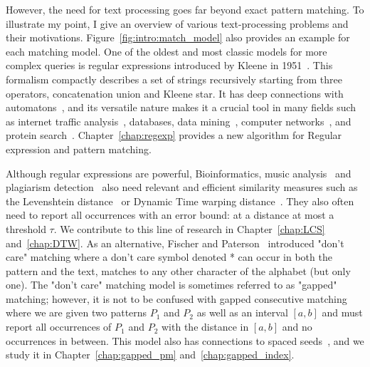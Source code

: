 However, the need for text processing goes far beyond exact pattern matching. To illustrate my point, I give an overview of various text-processing problems and their motivations. Figure~\ref{fig:intro:match_model} also provides an example for each matching model.
One of the oldest and most classic models for more complex queries is regular expressions introduced by Kleene in 1951~\cite{RM-704}.
This formalism compactly describes a set of strings recursively starting from three operators, concatenation union and Kleene star.
It has deep connections with automatons~\cite{Thompson_automaton}, and its versatile nature makes it a crucial tool in many fields such as internet traffic analysis~\cite{4221791,4579527}, databases, data mining~\cite{1000341,10.5555/645927.672035,10.1145/375551.375569}, computer networks~\cite{10.1145/1159913.1159952}, and protein search~\cite{10.1145/369133.369220}. Chapter~\ref{chap:regexp} provides a new algorithm for Regular expression and pattern matching.

Although regular expressions are powerful, Bioinformatics\cite{Gusfield1997}, music analysis~\cite{mongeau1990comparison} and plagiarism detection~\cite{lukashenko2007computer} also need relevant and efficient similarity measures such as the Levenshtein distance~\cite{levenshtein1966binary} or Dynamic Time warping distance~\cite{sakoe1978dynamic}. They also often need to report all occurrences with an error bound\cite{landau1986efficient,landau1989fast}: at a distance at most a threshold $\tau$.
We contribute to this line of research in Chapter~\ref{chap:LCS} and~\ref{chap:DTW}.
As an alternative, Fischer and Paterson~\cite{fischer1974string} introduced "don't care" matching where a don't care symbol denoted * can occur in both the pattern and the text, matches to any other character of the alphabet (but only one).
The "don't care" matching model is sometimes referred to as "gapped" matching; however, it is not to be confused with gapped consecutive matching~\cite{bille2022gapped} where we are given two patterns $P_1$ and $P_2$ as well as an interval $[a,b]$ and must report all occurrences of $P_1$ and $P_2$ with the distance in $[a,b]$ and no occurrences in between. This model also has connections to spaced seeds~\cite{burkhardt2003better}, and we study it in Chapter~\ref{chap:gapped_pm} and~\ref{chap:gapped_index}.

